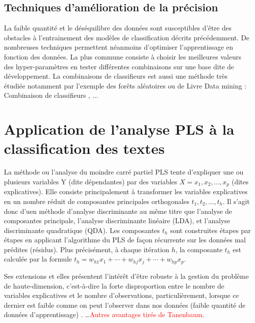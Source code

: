 \subsection{Techniques d'amélioration de la précision}
La faible quantité \citep{ruparel2013smalldataclass} et le déséquilibre des données sont susceptibles d'être des obstacles à l'entrainement des modèles de classification décrits précédemment. De nombreuses techniques permettent néanmoins d'optimiser l'apprentissage en fonction des données. La plus commune consiste à choisir les meilleures valeurs des hyper-paramètres en tester différentes combinaisons sur une base dite de développement. La combinaisons de classifieurs est aussi une méthode très étudiée \citep{kittler1996combiningclassifiers,kuncheva2004combiningclassifiers, tulyakov2008combiningclassifiers} notamment par l'exemple des forêts aléatoires \citep{breiman2001randomforest} ou de
Livre Data mining : Combinaison de classifieurs \citep{kittler1996combiningclassifiers,kuncheva2004combiningclassifiers, tulyakov2008combiningclassifiers} , ...

\section{Application de l'analyse PLS  à la classification des textes}
\label{sec:sensresultat:pls}

La méthode ou l'analyse du moindre carré partiel PLS \citep{bibid} tente d'expliquer une ou plusieurs variables Y (dite dépendantes) par des variables $X=x_1,x_2,...,x_p$ (dites explicatives). Elle consiste principalement à transformer les variables explicatives en un nombre réduit de composantes principales orthogonales $t_1, t_2, ..., t_h$. Il s'agit donc d'uen méthode d'analyse discriminante au même titre que l'analyse de composantes principale, l'analyse discriminante linéaire (LDA), et l'analyse discriminante quadratique (QDA). Les composantes $t_h$ sont construites étapes par étapes en applicant l'algorithme du PLS de façon récurrente sur les données mal prédites (résidus). Plus précisément, à chaque itération $h$, la composante $t_h$ est calculée par la formule $t_h = w_{h1} x_1 + \cdots + w_{hj} x_j + \cdots + w_{hp} x_p$. 

 Ses extensions et elles présentent l'intérêt d'être robuste à la gestion du problème de haute-dimension, c'est-à-dire la forte disproportion entre le nombre de variables explicatives et le nombre d'observations, particulièrement, lorsque ce dernier est faible comme on peut l'observer dans nos données (faible quantité de données d'apprentissage) \citep{bibid}. \dots \textcolor{red}{Autres avantages tirés de Tanenbaum}. %

